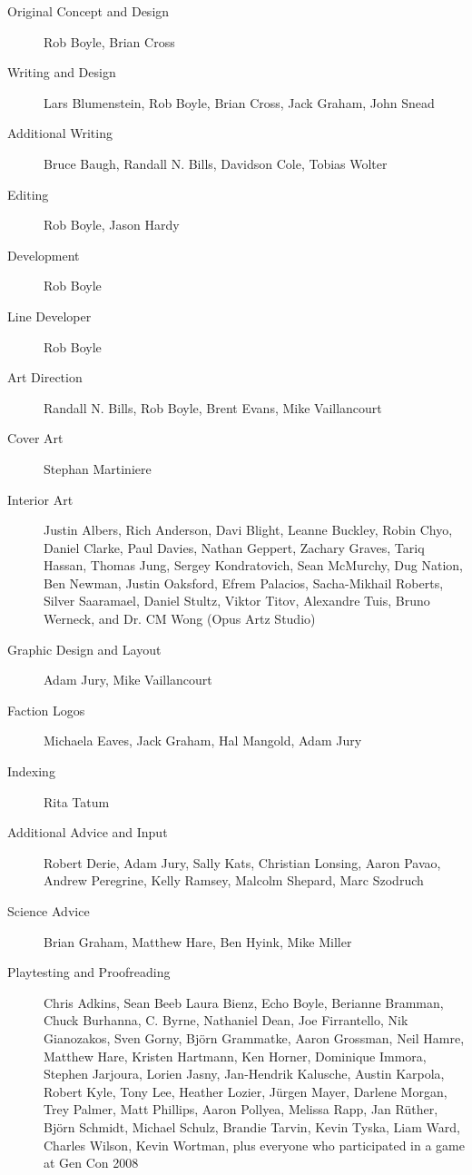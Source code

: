 \begin{description} 

\item[Original Concept and Design] Rob Boyle, Brian Cross 

\item[Writing and Design] Lars Blumenstein, Rob Boyle, Brian Cross, Jack Graham, John Snead 

\item[Additional Writing] Bruce Baugh, Randall N. Bills, Davidson Cole, Tobias Wolter 

\item[Editing] Rob Boyle, Jason Hardy 

\item[Development] Rob Boyle 

\item[Line Developer] Rob Boyle 

\item[Art Direction] Randall N. Bills, Rob Boyle, Brent Evans, Mike Vaillancourt 

\item[Cover Art] Stephan Martiniere 

\item[Interior Art] Justin Albers, Rich Anderson, Davi Blight, Leanne Buckley, Robin Chyo, Daniel Clarke, Paul Davies, Nathan Geppert, Zachary Graves, Tariq Hassan, Thomas Jung, Sergey Kondratovich, Sean McMurchy, Dug Nation, Ben Newman, Justin Oaksford, Efrem Palacios, Sacha-Mikhail Roberts, Silver Saaramael, Daniel Stultz, Viktor Titov, Alexandre Tuis, Bruno Werneck, and Dr. CM Wong (Opus Artz Studio) 

\item[Graphic Design and Layout] Adam Jury, Mike Vaillancourt 

\item[Faction Logos] Michaela Eaves, Jack Graham, Hal Mangold, Adam Jury 

\item[Indexing] Rita Tatum 

\item[Additional Advice and Input] Robert Derie, Adam Jury, Sally Kats, Christian Lonsing, Aaron Pavao, Andrew Peregrine, Kelly Ramsey, Malcolm Shepard, Marc Szodruch 

\item[Science Advice] Brian Graham, Matthew Hare, Ben Hyink, Mike Miller 

\item[Playtesting and Proofreading] Chris Adkins, Sean Beeb Laura Bienz, Echo Boyle, Berianne Bramman, Chuck Burhanna, C. Byrne, Nathaniel Dean, Joe Firrantello, Nik Gianozakos, Sven Gorny, Björn Grammatke, Aaron Grossman, Neil Hamre, Matthew Hare, Kristen Hartmann, Ken Horner, Dominique Immora, Stephen Jarjoura, Lorien Jasny, Jan-Hendrik Kalusche, Austin Karpola, Robert Kyle, Tony Lee, Heather Lozier, Jürgen Mayer, Darlene Morgan, Trey Palmer, Matt Phillips, Aaron Pollyea, Melissa Rapp, Jan Rüther, Björn Schmidt, Michael Schulz, Brandie Tarvin, Kevin Tyska, Liam Ward, Charles Wilson, Kevin Wortman, plus everyone who participated in a game at Gen Con 2008 


\end{description}
